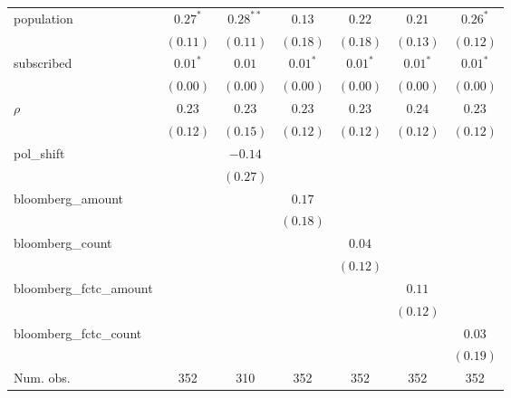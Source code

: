 \begin{table}[!h]
\begin{center}
\begin{tabular}{l c c c c c c }
population              & $0.27^{*}$   & $0.28^{**}$  & $0.13$       & $0.22$       & $0.21$       & $0.26^{*}$   \\
                        & $(0.11)$     & $(0.11)$     & $(0.18)$     & $(0.18)$     & $(0.13)$     & $(0.12)$     \\
subscribed              & $0.01^{*}$   & $0.01$       & $0.01^{*}$   & $0.01^{*}$   & $0.01^{*}$   & $0.01^{*}$   \\
                        & $(0.00)$     & $(0.00)$     & $(0.00)$     & $(0.00)$     & $(0.00)$     & $(0.00)$     \\
$\rho$                  & $0.23$       & $0.23$       & $0.23$       & $0.23$       & $0.24$       & $0.23$       \\
                        & $(0.12)$     & $(0.15)$     & $(0.12)$     & $(0.12)$     & $(0.12)$     & $(0.12)$     \\
pol\_shift              &              & $-0.14$      &              &              &              &              \\
                        &              & $(0.27)$     &              &              &              &              \\
bloomberg\_amount       &              &              & $0.17$       &              &              &              \\
                        &              &              & $(0.18)$     &              &              &              \\
bloomberg\_count        &              &              &              & $0.04$       &              &              \\
                        &              &              &              & $(0.12)$     &              &              \\
bloomberg\_fctc\_amount &              &              &              &              & $0.11$       &              \\
                        &              &              &              &              & $(0.12)$     &              \\
bloomberg\_fctc\_count  &              &              &              &              &              & $0.03$       \\
                        &              &              &              &              &              & $(0.19)$     \\
\midrule
Num. obs.               & 352          & 310          & 352          & 352          & 352          & 352          \\

\end{tabular}
\end{center}
\end{table}
